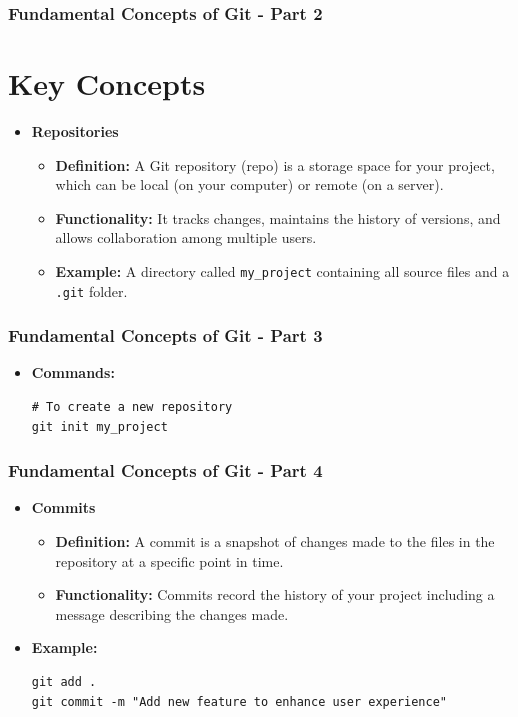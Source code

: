 \documentclass{beamer}
\begin{document}
\begin{frame}[fragile]
    \frametitle{Fundamental Concepts of Git - Part 2}
    \section*{Key Concepts}

    \begin{itemize}
        \item \textbf{Repositories}
        \begin{itemize}
            \item \textbf{Definition:} A Git repository (repo) is a storage space for your project, which can be local (on your computer) or remote (on a server).
            \item \textbf{Functionality:} It tracks changes, maintains the history of versions, and allows collaboration among multiple users.
            \item \textbf{Example:} A directory called \texttt{my\_project} containing all source files and a \texttt{.git} folder.
        \end{itemize}
    \end{itemize}
\end{frame}

\begin{frame}[fragile]
    \frametitle{Fundamental Concepts of Git - Part 3}
    \begin{itemize}
        \item \textbf{Commands:} 
        \begin{lstlisting}
# To create a new repository
git init my_project
        \end{lstlisting}
    \end{itemize}
\end{frame}

\begin{frame}[fragile]
    \frametitle{Fundamental Concepts of Git - Part 4}
    \begin{itemize}
        \item \textbf{Commits}
        \begin{itemize}
            \item \textbf{Definition:} A commit is a snapshot of changes made to the files in the repository at a specific point in time.
            \item \textbf{Functionality:} Commits record the history of your project including a message describing the changes made.
        \end{itemize}
        \item \textbf{Example:}
        \begin{lstlisting}
git add .
git commit -m "Add new feature to enhance user experience"
        \end{lstlisting}
    \end{itemize}
\end{frame}
\end{document}
